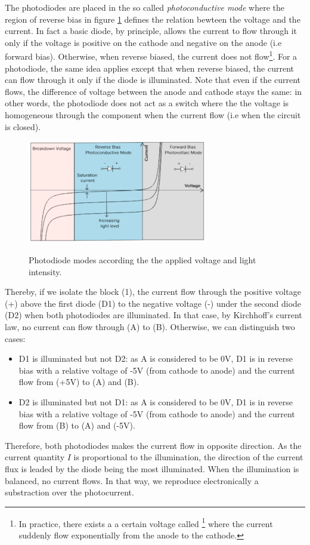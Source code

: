 \documentclass[10pt]{report}
\begin{document}
The photodiodes are placed in the so called \textit{photoconductive mode} where the region of reverse bias in figure \ref{fig:photodiode-vi} defines the relation bewteen the voltage and the current. In fact a basic diode, by principle, allows the current to flow through it only if the voltage is positive on the cathode and negative on the anode (i.e forward bias). Otherwise, when reverse biased, the current does not flow\footnote{In practice, there exists a a certain voltage called \footnote{breakdown voltage} where the current suddenly flow exponentially from the anode to the cathode.}. For a photodiode, the same idea applies except that when reverse biased, the current can flow through it only if the diode is illuminated. Note that even if the current flows, the difference of voltage between the anode and cathode stays the same: in other words, the photodiode does not act as a switch where the the voltage is homogeneous through the component when the current flow (i.e when the circuit is closed). 

\begin{figure}[h!]
\caption{Photodiode modes according the the applied voltage and light intensity.}
\centering
\includegraphics[width=0.7\textwidth]{photodiode-vi}
\label{fig:photodiode-vi}
\end{figure}

Thereby, if we isolate the block (1), the current flow through the positive voltage (+) above the first diode (D1) to the negative voltage (-) under the second diode (D2) when both photodiodes are illuminated. In that case, by Kirchhoff's current law, no current can flow through (A) to (B). Otherwise, we can distinguish two cases:
\begin{itemize}
 \item D1 is illuminated but not D2: as A is considered to be 0V, D1 is in reverse bias with a relative voltage of -5V (from cathode to anode) and the current flow from (+5V) to (A) and (B).
 \item D2 is illuminated but not D1: as A is considered to be 0V, D1 is in reverse bias with a relative voltage of -5V (from cathode to anode) and the current flow from (B) to (A) and (-5V).
\end{itemize}
Therefore, both photodiodes makes the current flow in opposite direction. As the current quantity $I$ is proportional to the illumination, the direction of the current flux is leaded by the diode being the most illuminated. When the illumination is balanced, no current flows. In that way, we reproduce electronically a substraction over the photocurrent.
\end{document}
